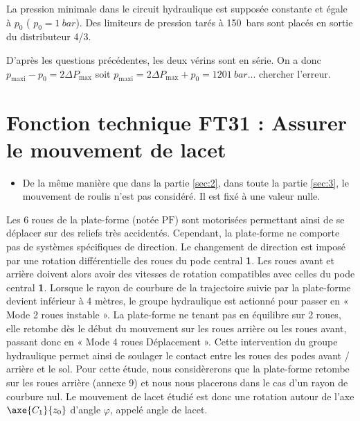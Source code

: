 \else
\fi



La pression minimale dans le circuit hydraulique est supposée constante et égale à $p_0$ ( $p_0 = \SI{1}{bar}$). Des limiteurs de pression tarés à \SI{150}{bars} sont placés en sortie du distributeur 4/3.

\ifprof
\begin{corrige}
D'après les questions précédentes, les deux vérins sont en série. On a donc $p_{\text{maxi}} - p_0 = 2 \Delta P_{\text{max}}$ soit 
$p_{\text{maxi}} = 2 \Delta P_{\text{max}} + p_0 = \SI{1201}{bar}$... chercher l'erreur.
\end{corrige}
\else
\fi


\section{\label{sec:3}Fonction technique FT31 : Assurer le mouvement de lacet}

\begin{hypo}%

\begin{itemize}
\item De la même manière que dans la partie \ref{sec:2}, dans toute la partie \ref{sec:3}, le mouvement de roulis n’est pas considéré. Il est fixé à une valeur nulle.
\end{itemize}
\end{hypo}

\ifprof
\else

Les 6 roues de la plate-forme (notée $\text{PF}$) sont motorisées permettant ainsi de se déplacer sur des reliefs très
accidentés. Cependant, la plate-forme ne comporte pas de systèmes spécifiques de direction. Le changement de
direction est imposé par une rotation différentielle des roues du pode central \textbf{1}. Les roues avant et arrière doivent alors avoir des vitesses de rotation compatibles avec celles du pode central \textbf{1}. Lorsque le rayon de courbure de la trajectoire suivie par la plate-forme devient inférieur à 4 mètres, le groupe hydraulique est actionné pour passer en « Mode 2 roues instable ». La plate-forme ne tenant pas en équilibre sur 2 roues, elle retombe dès le début du mouvement sur les roues arrière ou les roues avant, passant donc en « Mode 4 roues Déplacement ». Cette intervention du groupe hydraulique permet ainsi de soulager le contact entre les roues des podes avant / arrière et le sol. Pour cette étude, nous considèrerons que la plate-forme retombe sur les roues arrière (annexe 9) et nous nous placerons dans le cas d’un rayon de courbure nul. Le mouvement de lacet étudié est donc une rotation autour de l’axe $\axe{C_1}{z_0}$ d’angle $\varphi$, appelé angle de lacet.


